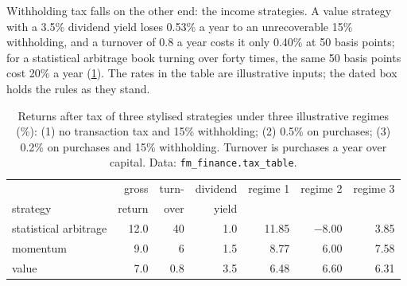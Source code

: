 \begin{omfigure}

\label{fig:fm:finance-product-control-and-tax:turnover}
\end{omfigure}

Withholding tax falls on the other end: the income strategies. A value strategy with a 3.5\% dividend yield loses 0.53\% a year to an
unrecoverable 15\% withholding, and a turnover of 0.8 a year costs it only 0.40\% at 50 basis points; for a statistical arbitrage book turning over
forty times, the same 50 basis points cost 20\% a year (\cref{tab:fm:finance-product-control-and-tax:tax}). The rates in the table are
illustrative inputs; the dated box holds the rules as they stand.

\begin{table}[ht]
\centering\small
\begin{tabular}{lrrrrrr}
\toprule
 & gross & turn- & dividend & regime 1 & regime 2 & regime 3 \\
strategy & return & over & yield & & & \\
\midrule
statistical arbitrage & 12.0 & 40 & 1.0 & 11.85 & $-$8.00 & 3.85 \\
momentum & 9.0 & 6 & 1.5 & 8.77 & 6.00 & 7.58 \\
value & 7.0 & 0.8 & 3.5 & 6.48 & 6.60 & 6.31 \\
\bottomrule
\end{tabular}
\caption{Returns after tax of three stylised strategies under three illustrative regimes (\%): (1) no transaction tax and 15\% withholding;
(2) 0.5\% on purchases; (3) 0.2\% on purchases and 15\% withholding. Turnover is purchases a year over capital. Data: \texttt{fm\_finance.tax\_table}.}\label{tab:fm:finance-product-control-and-tax:tax}
\end{table}


